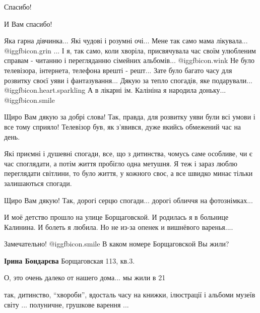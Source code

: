 \begin{itemize}
Спасибо!

И Вам спасибо!


Яка гарна дівчинка... Які чудові і розумні очі... Мене так само мама
лікувала...  @igg{fbicon.grin} ... І я, так само, коли хворіла, присвячувала
час своїм улюбленим справам - читанню і перегляданню сімейних альбомів...
@igg{fbicon.wink}  Не було телевізора, інтернета, телефона врешті - решт...
Зате було багато часу для розвитку своєї уяви і фантазування... Дякую за тепло
спогадів, яке подарували...  @igg{fbicon.heart.sparkling}  А в лікарні ім.
Калініна я народила доньку...  @igg{fbicon.smile} 

\begin{itemize} %

Щиро Вам дякую за добрі слова! Так, правда, для розвитку уяви були всі умови і
все тому сприяло! Телевізор був, як з'явився, дуже якийсь обмежений час на
день.

\end{itemize} %


Які приємні і душевні спогади, все, що з дитинства, чомусь саме особливе, чи є час
споглядати, а потім життя пробігло одна метушня. Я теж і зараз люблю переглядати
світлини, то було життя, у кожного своє, а все швидко минає тільки залишаються
спогади.

Щиро Вам дякую!
Так, дорогі серцю спогади... дорогі обличчя на фотознімках...


И моё детство прошло на улице Борщаговской. И родилась я в больнице Калинина. И
болеть я любила. Но не из-за опенек и вишнёвого варенья....

\begin{itemize} %
Замечательно!  @igg{fbicon.smile}  В каком номере Борщаговской Вы жили?

\textbf{Ірина Бондарєва} Борщаговская 113, кв.3.

О, это очень далеко от нашего дома... мы жили в 21
\end{itemize} %

так, дитинство, \enquote{хвороби}, вдосталь часу на книжки, ілюстрації і альбоми музеїв
світу ... полуничне, грушкове варення ...


\end{itemize}
